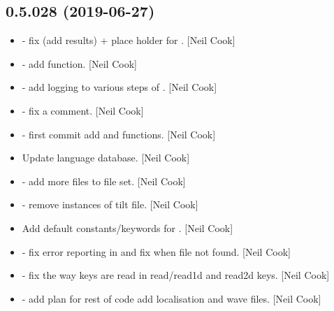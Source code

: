 \documentclass[a4paper,10pt,english]{report}
\begin{document}
\subsection{0.5.028 (2019-06-27)}
\label{\detokenize{misc/changelog:id108}}\begin{itemize}
\item {} 
 - fix  (add 
results) + place holder for . {[}Neil Cook{]}

\item {} 
 - add  function. {[}Neil
Cook{]}

\item {} 
 - add logging to various steps of
. {[}Neil Cook{]}

\item {} 
 - fix a comment. {[}Neil Cook{]}

\item {} 
 - first commit add  and
 functions. {[}Neil Cook{]}

\item {} 
Update language database. {[}Neil Cook{]}

\item {} 
 - add more files to  file set. {[}Neil Cook{]}

\item {} 
 - remove instances of tilt file. {[}Neil Cook{]}

\item {} 
Add default constants/keywords for . {[}Neil Cook{]}

\item {} 
 - fix error reporting in  and fix
 when file not found. {[}Neil Cook{]}

\item {} 
 - fix the way keys are read in read/read1d and read2d
keys. {[}Neil Cook{]}

\item {} 
 - add plan for rest of code add
localisation and wave files. {[}Neil Cook{]}


\end{itemize}
\end{document}

